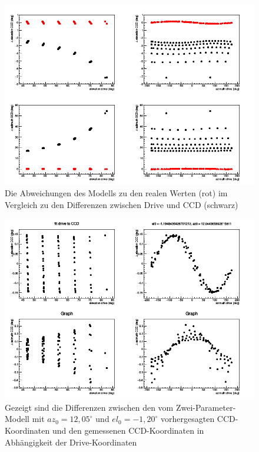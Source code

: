 \begin{figure}[htbp]
\centering
\includegraphics[width=\textwidth]{../341/D2Ccomp.png}
\caption{Die Abweichungen des Modells zu den realen Werten (rot) im Vergleich zu den Differenzen zwischen Drive und CCD (schwarz)}
\label{img:D2Ccomp}
\end{figure}
\begin{figure}[htbp]
\centering
\includegraphics[width=\textwidth]{../341/run341D2C.png}
\caption{Gezeigt sind die Differenzen zwischen den vom Zwei-Parameter-Modell mit $az_0=12,05^{\circ}$ und $el_0=-1,20^{\circ}$ vorhergesagten CCD-Koordinaten und den gemessenen CCD-Koordinaten in Abhängigkeit der Drive-Koordinaten}
\label{img:D2C}
\end{figure}
